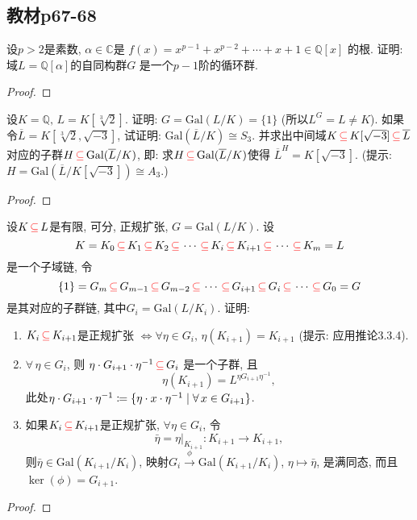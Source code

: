 \subsection{教材p67-68}

\begin{problem}
    设$p > 2$是素数, $\alpha \in \mathbb{C}$是
$f(x) = x^{p - 1} + x^{p - 2} + \cdots + x + 1 \in \mathbb{Q}[x]$
的根. 证明: 域$L = \mathbb{Q}[\alpha]$的自同构群$G$
是一个$p - 1$阶的循环群.
\end{problem}

\begin{proof}
    
\end{proof}

\begin{problem}
    设$K = \mathbb{Q},\, L = K[\sqrt[3]{2}]$.
证明: $G = \mathrm{Gal}(L/K)=\{1\}$ (所以$L^G = L \neq K$).
如果令$\overline{L} = K[\sqrt[3]{2}, \sqrt{-3}]$,
试证明: $\mathrm{Gal}(\overline{L}/K) \cong S_3$.
并求出中间域$K \,\textcolor{red}{\subseteq}\, K[\sqrt{-3}] \,\textcolor{red}{\subseteq}\, \overline{L}$
对应的子群$H \,\textcolor{red}{\subseteq}\, \mathrm{Gal}(\overline L/K)$,
即: 求$H \,\textcolor{red}{\subseteq}\, \mathrm{Gal}(\overline L/K)$使得
$\overline{L}^{H} = K[\sqrt{-3}]$.
(提示: $H = \mathrm{Gal}(\overline L/K[\sqrt{-3}]) \cong A_3$.)
\end{problem}

\begin{proof}
    
\end{proof}

\begin{problem}
    设$K \,\textcolor{red}{\subseteq}\, L$是有限, 可分, 正规扩张, $G = \mathrm{Gal}(L/K)$.
设
\[
    K = K_0 \,\textcolor{red}{\subseteq}\, K_1 \,\textcolor{red}{\subseteq}\, K_2 \,\textcolor{red}{\subseteq}\, \cdots \,\textcolor{red}{\subseteq}\, K_i \,\textcolor{red}{\subseteq}\, K_{i + 1} \,\textcolor{red}{\subseteq}\, \cdots \,\textcolor{red}{\subseteq}\, K_m = L
\]
是一个子域链, 令
\[
    \{1\} = G_m \,\textcolor{red}{\subseteq}\, G_{m - 1} \,\textcolor{red}{\subseteq}\, G_{m - 2} \,\textcolor{red}{\subseteq}\, \cdots \,\textcolor{red}{\subseteq}\, G_{i + 1} \,\textcolor{red}{\subseteq}\, G_i \,\textcolor{red}{\subseteq}\, \cdots \,\textcolor{red}{\subseteq}\, G_0 = G
\]
是其对应的子群链, 其中$G_i = \mathrm{Gal}(L/K_i)$. 证明: 
\begin{enumerate}[(1)]
    \item $K_i \,\textcolor{red}{\subseteq}\, K_{i + 1}$是正规扩张
$\Leftrightarrow \forall \eta \in G_i,\, \eta(K_{i + 1}) = K_{i + 1}$
(提示: 应用推论3.3.4).
    \item $\forall\, \eta \in G_i$, 则
$\eta \cdot G_{i + 1} \cdot \eta^{-1} \,\textcolor{red}{\subseteq}\, G_i$
是一个子群, 且
\[
    \eta(K_{i + 1}) = L^{\eta G_{i + 1}\eta^{-1}},
\]
此处$\eta \cdot G_{i + 1} \cdot \eta ^{- 1} \mathrel{\coloneqq} \{\eta \cdot x \cdot \eta^{-1} \mid \forall\, x \in G_{i + 1}\}$.
    \item 如果$K_i \,\textcolor{red}{\subseteq}\, K_{i + 1}$是正规扩张, $\forall \eta \in G_i$,
令
\[
    \bar{\eta} = \eta|_{K_{i + 1}}:K_{i + 1} \to K_{i + 1},
\]
则$\bar{\eta} \in \mathrm{Gal}(K_{i + 1}/K_i)$,
映射$G_i \overset{\phi}\to \mathrm{Gal}(K_{i + 1}/K_i)$,
$\eta \mapsto \bar{\eta}$, 是满同态, 而且
$\ker(\phi) = G_{i + 1}$.
\end{enumerate}
\end{problem}

\begin{proof}
    
\end{proof}